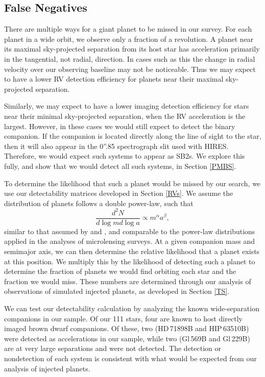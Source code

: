 \subsection{False Negatives}
\label{FN}

There are multiple ways for a giant planet to be missed in our survey. For each planet in a wide orbit, we observe only a fraction of a revolution. A planet near its maximal sky-projected separation from its host star has acceleration primarily in the tangential, not radial, direction. In cases such as this the change in radial velocity over our observing baseline may not be noticeable. Thus we may expect to have a lower RV detection efficiency for planets near their maximal sky-projected separation. 

Similarly, we may expect to have a lower imaging detection efficiency for stars near their minimal sky-projected separation, when the RV acceleration is the largest. However, in these cases we would still expect to detect the binary companion. If the companion is located directly along the line of sight to the star, then it will also appear in the 0''.85 spectrograph slit used with HIRES. Therefore, we would expect such systems to appear as SB2s. We explore this fully, and show that we would detect all such systems, in Section \ref{PMBS}.

To determine the likelihood that such a planet would be missed by our search, we use our detectability matrices developed in Section \ref{RVs}. We assume the distribution of planets follows a double power-law, such that
\begin{equation}
\frac{d^2N}{d\log m d\log a} \propto m^{\alpha} a^{\beta},
\label{DPL}
\end{equation}
similar to that assumed by \citet{Cumming08} and \citet{Bowler10}, and comparable to the power-law distributions applied in the analyses of microlensing surveys. At a given companion mass and semimajor axis, we can then determine the relative likelihood that a planet exists at this position. We multiply this by the likelihood of detecting such a planet to determine the fraction of planets we would find orbiting each star and the fraction we would miss. These numbers are determined through our analysis of observations of simulated injected planets, as developed in Section \ref{TS}.

We can test our detectability calculation by analyzing the known wide-separation companions in our sample. Of our 111 stars, four are known to host directly imaged brown dwarf companions. Of these, two (HD\,71898B and HIP\,63510B) were detected as accelerations in our sample, while two (Gl\,569B and Gl\,229B) are at very large separations and were not detected. The detection or nondetection of each system is consistent with what would be expected from our analysis of injected planets.



